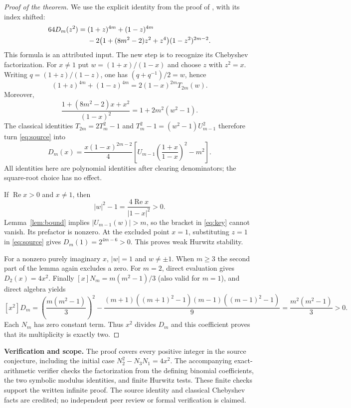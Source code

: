 \documentclass[11pt]{article}
\newcommand{\Rea}{\operatorname{Re}}
\begin{document}
\begin{proof}[Proof of the theorem]
We use the explicit identity from the proof of
\cite[Theorem 14, p.~10]{DZ}, with its index shifted:
\begin{align}
64D_m(z^2)={}&(1+z)^{4m}+(1-z)^{4m} \notag\\
 &-2\bigl(1+(8m^2-2)z^2+z^4\bigr)(1-z^2)^{2m-2}.
\label{eq:source}
\end{align}
This formula is an attributed input. The new step is to recognize its
Chebyshev factorization.
For $x\ne1$ put $w=(1+x)/(1-x)$ and choose $z$ with $z^2=x$.
Writing $q=(1+z)/(1-z)$, one has $(q+q^{-1})/2=w$, hence
\[
 (1+z)^{4m}+(1-z)^{4m}
 =2(1-x)^{2m}T_{2m}(w).
\]
Moreover,
\[
 \frac{1+(8m^2-2)x+x^2}{(1-x)^2}
 =1+2m^2(w^2-1).
\]
The classical identities $T_{2m}=2T_m^2-1$ and
$T_m^2-1=(w^2-1)U_{m-1}^2$ therefore turn
\eqref{eq:source} into
\begin{equation}\label{eq:key}
 D_m(x)=\frac{x(1-x)^{2m-2}}4
 \left[U_{m-1}\!\left(\frac{1+x}{1-x}\right)^2-m^2\right].
\end{equation}
All identities here are polynomial identities after clearing denominators;
the square-root choice has no effect.

If $\Rea x>0$ and $x\ne1$, then
\[
 |w|^2-1=\frac{4\Rea x}{|1-x|^2}>0.
\]
Lemma~\ref{lem:bound} implies $|U_{m-1}(w)|>m$, so
the bracket in \eqref{eq:key} cannot vanish. Its prefactor is nonzero.
At the excluded point $x=1$, substituting $z=1$ in
\eqref{eq:source} gives $D_m(1)=2^{4m-6}>0$.
This proves weak Hurwitz stability.

For a nonzero purely imaginary $x$, $|w|=1$ and $w\ne\pm1$.
When $m\ge3$ the second part of the lemma again excludes a zero.
For $m=2$, direct evaluation gives $D_2(x)=4x^2$.
Finally $[x]N_m=m(m^2-1)/3$ (also valid for $m=1$), and direct
algebra yields
\[
 [x^2]D_m=
 \left(\frac{m(m^2-1)}3\right)^2
 -\frac{(m+1)((m+1)^2-1)(m-1)((m-1)^2-1)}9
 =\frac{m^2(m^2-1)}3>0.
\]
Each $N_m$ has zero constant term. Thus $x^2$ divides $D_m$
and this coefficient proves that its multiplicity is exactly two.
\end{proof}

\noindent\textbf{Verification and scope.}
The proof covers every positive integer in the source conjecture, including
the initial case $N_2^2-N_3N_1=4x^2$.
The accompanying exact-arithmetic verifier checks the factorization from
the defining binomial coefficients, the two symbolic modulus identities,
and finite Hurwitz tests. These finite checks support the written infinite
proof. The source identity and classical Chebyshev facts are credited;
no independent peer review or formal verification is claimed.
\end{document}
